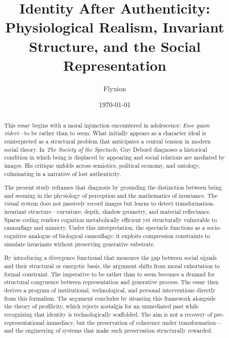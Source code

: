 \documentclass[11pt]{article}
\title{Identity After Authenticity:\\
\large Physiological Realism, Invariant Structure, and the Social Representation}
\author{Flyxion}
\date{\today}
\begin{document}
\maketitle
\begin{abstract}

This essay begins with a moral injunction encountered in adolescence: \textit{Esse quam videri}---to be rather than to seem. What initially appears as a character ideal is reinterpreted as a structural problem that anticipates a central tension in modern social theory. In \textit{The Society of the Spectacle}, Guy Debord diagnoses a historical condition in which being is displaced by appearing and social relations are mediated by images. His critique unfolds across semiotics, political economy, and ontology, culminating in a narrative of lost authenticity.

The present study reframes that diagnosis by grounding the distinction between being and seeming in the physiology of perception and the mathematics of invariance. The visual system does not passively record images but learns to detect transformation-invariant structure---curvature, depth, shadow geometry, and material reflectance. Sparse coding renders cognition metabolically efficient yet structurally vulnerable to camouflage and mimicry. Under this interpretation, the spectacle functions as a socio-cognitive analogue of biological camouflage: it exploits compression constraints to simulate invariants without preserving generative substrate.

By introducing a divergence functional that measures the gap between social signals and their structural or energetic basis, the argument shifts from moral exhortation to formal constraint. The imperative to be rather than to seem becomes a demand for structural congruence between representation and generative process. The essay then derives a program of institutional, technological, and personal interventions directly from this formalism. The argument concludes by situating this framework alongside the theory of profilicity, which rejects nostalgia for an unmediated past while recognizing that identity is technologically scaffolded. The aim is not a recovery of pre-representational immediacy, but the preservation of coherence under transformation---and the engineering of systems that make such preservation structurally rewarded.

\end{abstract}

\newpage
{
\small
\tableofcontents
}
\end{document}
